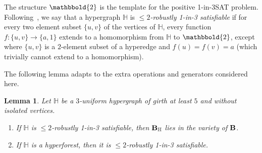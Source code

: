 \documentclass[eqnor,reqno]{amsart}
\theoremstyle{plain}
\newtheorem{lem}[thm]{Lemma}
\theoremstyle{definition}
\begin{document}
The structure $\mathbbold{2}$ is the template for the positive 1-in-3SAT problem.
Following~\cite{jac:SAT}, we say that a hypergraph $\mathbb{H}$ is \emph{$\leq 2$-robustly 1-in-3 satisfiable} if for every two element subset $\{u,v\}$ of the vertices of $\mathbb{H}$, every function $f:\{u,v\}\to\{a,1\}$ extends to a homomorphism from $\mathbb{H}$ to $\mathbbold{2}$, except where $\{u,v\}$ is a $2$-element subset of a hyperedge and $f(u)=f(v)=a$ (which trivially cannot extend to a homomorphism). 

The following lemma adapts  \cite[Lemma~4.1]{JRZ} to the extra operations and generators considered here.
\begin{lem}\label{lem:hypergraphproperties}
Let $\mathbb{H}$ be a $3$-uniform hypergraph of girth at least $5$ and without isolated vertices.
\begin{enumerate}
\item 
If $\mathbb{H}$ is $\leq 2$-robustly 1-in-3 satisfiable, then ${\bf B}_{\mathbb{H}}$ lies in the variety of ${\bf B}$.
\item If $\mathbb{H}$ is a hyperforest, then it is $\leq 2$-robustly 1-in-3 satisfiable.
\end{enumerate}
\end{lem}
\end{document}
